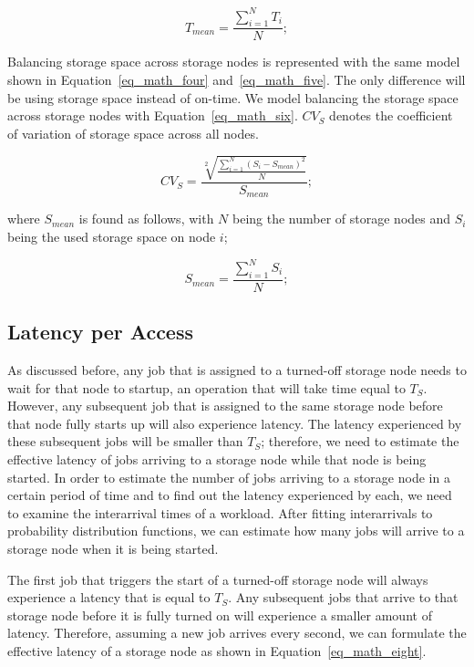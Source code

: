\documentclass[preprint,12pt]{elsarticle}
\begin{document}
\begin{equation}
\label{eq_math_five}
T_{mean} = \frac{\sum\limits_{i=1}^N T_i}{N};
\end{equation}
\hfill

Balancing storage space across storage nodes is represented with the same
model shown in Equation~\eqref{eq_math_four}
and~\eqref{eq_math_five}. The only difference will be using storage
space instead of on-time. We model balancing the storage space across storage nodes with
Equation~\eqref{eq_math_six}. $CV_{S}$ denotes the coefficient of
variation of storage space across all nodes.

\begin{equation}
\label{eq_math_six}
CV_{S} = \frac{\sqrt[2]{\frac{\sum\limits_{i=1}^N (S_i - S_{mean}) ^ 2}{N}}}{S_{mean}};
\end{equation}
\hfill

where $S_{mean}$ is found as follows, with $N$ being the number of storage nodes
and $S_i$ being the used storage space on node $i$;

\begin{equation}
\label{eq_math_seven}
S_{mean} = \frac{\sum\limits_{i=1}^N S_i}{N};
\end{equation}
\hfill
 
\subsection{Latency per Access}
As discussed before, any job
that is assigned to a turned-off storage node needs to wait for that node
to startup, an operation that will take time equal to $T_S$.
However, any subsequent job that is assigned to the same storage node before that
node fully starts up will also experience latency. The latency
experienced by these subsequent jobs will be smaller than $T_S$;
therefore, we need to estimate the effective latency of jobs arriving
to a storage node while that node is being started. In order to estimate
the number of jobs arriving to a storage node in a certain period of time and
to find out the latency experienced by each, we need to examine the
interarrival times of a workload. After fitting interarrivals to
probability distribution functions, we can estimate how many jobs will
arrive to a storage node when it is being started.

The first job that triggers the start of a turned-off storage node will
always experience a latency that is equal to $T_S$. Any subsequent
jobs that arrive to that storage node before it is fully turned on will experience
a smaller amount of latency. Therefore, assuming a new job arrives every
second, we can formulate the effective latency of a storage node as shown
in Equation~\eqref{eq_math_eight}.
\end{document}
